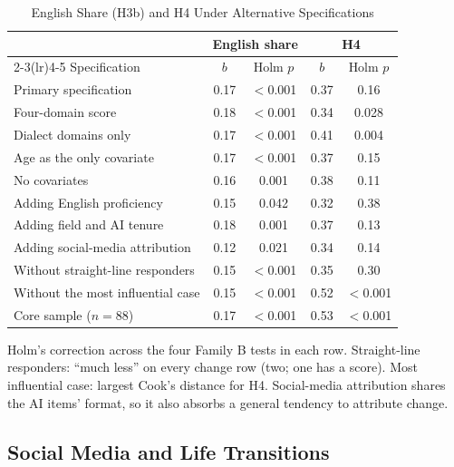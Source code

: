 \documentclass[conference]{IEEEtran}
\begin{document}
\begin{table}[t]
\centering
\begin{threeparttable}
\caption{English Share (H3b) and H4 Under Alternative Specifications}
\label{tab:spec}
\footnotesize
\setlength{\tabcolsep}{3pt}
\begin{tabular}{@{}lcccc@{}}
\toprule
& \multicolumn{2}{c}{English share} & \multicolumn{2}{c}{H4} \\
\cmidrule(lr){2-3}\cmidrule(lr){4-5}
Specification & $b$ & Holm $p$ & $b$ & Holm $p$ \\
\midrule
Primary specification & 0.17 & $<$0.001 & 0.37 & 0.16 \\
Four-domain score & 0.18 & $<$0.001 & 0.34 & 0.028 \\
Dialect domains only & 0.17 & $<$0.001 & 0.41 & 0.004 \\
Age as the only covariate & 0.17 & $<$0.001 & 0.37 & 0.15 \\
No covariates & 0.16 & 0.001 & 0.38 & 0.11 \\
Adding English proficiency & 0.15 & 0.042 & 0.32 & 0.38 \\
Adding field and AI tenure & 0.18 & 0.001 & 0.37 & 0.13 \\
Adding social-media attribution & 0.12 & 0.021 & 0.34 & 0.14 \\
Without straight-line responders & 0.15 & $<$0.001 & 0.35 & 0.30 \\
Without the most influential case & 0.15 & $<$0.001 & 0.52 & $<$0.001 \\
Core sample ($n=88$) & 0.17 & $<$0.001 & 0.53 & $<$0.001 \\
\bottomrule
\end{tabular}
\begin{tablenotes}[flushleft]\footnotesize
\item Holm's correction across the four Family B tests in each row. Straight-line responders: ``much less'' on every change row (two; one has a score). Most influential case: largest Cook's distance for H4. Social-media attribution shares the AI items' format, so it also absorbs a general tendency to attribute change.
\end{tablenotes}
\end{threeparttable}
\end{table}

\subsection{Social Media and Life Transitions}
\end{document}
